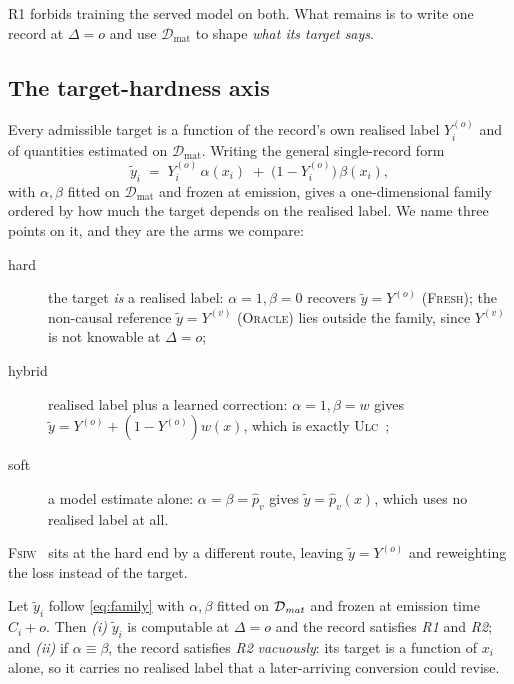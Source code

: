 \documentclass[runningheads]{llncs}
\newcommand{\Yo}{Y^{(o)}}
\newcommand{\Yv}{Y^{(v)}}
\begin{document}
R1 forbids training the served model on both. What remains is to write one record at $\Delta = o$
and use $\mathcal{D}_{\text{mat}}$ to shape \emph{what its target says}.

\subsection{The target-hardness axis}\label{sec:axis}

Every admissible target is a function of the record's own realised label $\Yo_i$ and of quantities
estimated on $\mathcal{D}_{\text{mat}}$. Writing the general single-record form
\begin{equation}\label{eq:family}
\tilde y_i \;=\; \Yo_i\,\alpha(x_i) \;+\; \bigl(1 - \Yo_i\bigr)\,\beta(x_i),
\end{equation}
with $\alpha,\beta$ fitted on $\mathcal{D}_{\text{mat}}$ and frozen at emission, gives a
one-dimensional family ordered by how much the target depends on the realised label. We name three
points on it, and they are the arms we compare:
\begin{description}
\item[hard] the target \emph{is} a realised label: $\alpha{=}1,\beta{=}0$ recovers
$\tilde y = \Yo$ (\textsc{Fresh}); the non-causal reference $\tilde y = \Yv$ (\textsc{Oracle}) lies
outside the family, since $\Yv$ is not knowable at $\Delta = o$;
\item[hybrid] realised label plus a learned correction: $\alpha{=}1,\beta{=}w$ gives
$\tilde y = \Yo + (1-\Yo)w(x)$, which is exactly \textsc{Ulc}~\cite{wang2023unbiased};
\item[soft] a model estimate alone: $\alpha{=}\beta{=}\hat p_v$ gives $\tilde y = \hat p_v(x)$,
which uses no realised label at all.
\end{description}
\textsc{Fsiw}~\cite{yasui2020feedback} sits at the hard end by a different route, leaving
$\tilde y = \Yo$ and reweighting the loss instead of the target.

\begin{proposition}\label{prop:axis}
Let $\tilde y_i$ follow \eqref{eq:family} with $\alpha,\beta$ fitted on $\mathcal{D}_{\emph{mat}}$
and frozen at emission time $C_i + o$. Then \emph{(i)} $\tilde y_i$ is computable at $\Delta = o$
and the record satisfies \emph{R1} and \emph{R2}; and \emph{(ii)} if $\alpha \equiv \beta$, the
record satisfies \emph{R2} \emph{vacuously}: its target is a function of $x_i$ alone, so it carries
no realised label that a later-arriving conversion could revise.
\end{proposition}
\end{document}
